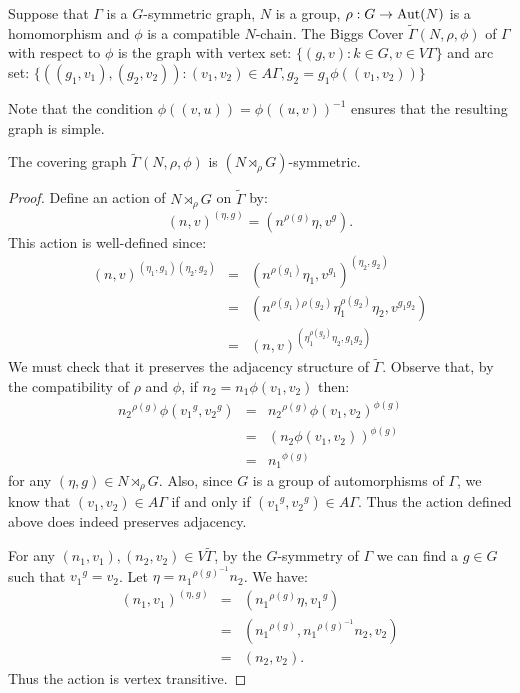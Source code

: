\begin{definition}
Suppose that $\Gamma$ is a $G$-symmetric graph, $N$ is a group,
$\rho : G \to \operatorname{Aut}(N)$ is a homomorphism and $\phi$ is a compatible $N$-chain.
The Biggs Cover $\widetilde{\Gamma}(N,\rho,\phi)$
of $\Gamma$ with respect to $\phi$ is the graph
with vertex set:
$\{ (g,v) : k \in G, v \in V \Gamma \}$
and arc set:
$ \{ ((g_1,v_1),(g_2,v_2)) : (v_1,v_2) \in A \Gamma, g_2 = g_1 \phi((v_1,v_2)) \}$
\end{definition}

Note that the condition $\phi((v,u)) = \phi((u,v))^{-1}$ ensures that the resulting
graph is simple.

\begin{proposition}
The covering graph $\widetilde{\Gamma}(N,\rho,\phi)$ is $(N \rtimes_\rho G)$-symmetric.
\begin{proof}

Define an action of $N \rtimes_\rho G$ on $\widetilde{\Gamma}$ by:
$$(n,v)^{(\eta, g)} = (n^{\rho(g)} \eta,v^g).$$
This action is well-defined since:
\begin{eqnarray*}
(n,v)^{(\eta_1, g_1)(\eta_2, g_2)}
& = & (n^{\rho(g_1)} \eta_1 ,v^{g_1})^{(\eta_2, g_2)} \\
& = & (n^{\rho(g_1) \rho(g_2)} \eta_1^{\rho(g_2)} \eta_2 , v^{g_1 g_2}) \\
& = & (n,v)^{(\eta_1^{\rho(g_2)} \eta_2, g_1 g_2)}
\end{eqnarray*}
We must check that it preserves the adjacency structure of $\widetilde{\Gamma}$.
Observe that, by the compatibility of $\rho$ and $\phi$,
if $n_2 = n_1 \phi(v_1,v_2)$ then:
\begin{eqnarray*}
{n_2}^{\rho(g)} \phi({v_1}^g, {v_2}^g)
& = & {n_2}^{\rho(g)} \phi(v_1, v_2)^{\phi(g)} \\
& = & (n_2 \phi(v_1, v_2))^{\phi(g)} \\
& = & {n_1}^{\phi(g)}
\end{eqnarray*}
for any $(\eta,g) \in N \rtimes_\rho G$.
Also, since $G$ is a group of automorphisms of $\Gamma$, we know that
$(v_1,v_2) \in A \Gamma$ if and only if $({v_1}^g,{v_2}^g) \in A \Gamma$.
Thus the action defined above does indeed preserves adjacency.

\hfill \break
For any $(n_1,v_1), (n_2,v_2) \in V \widetilde{\Gamma}$,
by the $G$-symmetry of $\Gamma$ we can find a $g \in G$
such that ${v_1}^g = {v_2}$.
Let $\eta = {n_1}^{\rho(g)^{-1}} n_2$.
We have:
\begin{eqnarray*}
(n_1,v_1)^{(\eta,g)} & = & ({n_1}^{\rho(g)} \eta,{v_1}^g) \\
                    & = & ( {n_1}^{\rho(g)}, {n_1}^{\rho(g)^{-1}} n_2,v_2) \\
		    & = & (n_2,v_2).
\end{eqnarray*}
Thus the action is vertex transitive.


\end{proof}
\end{proposition}
